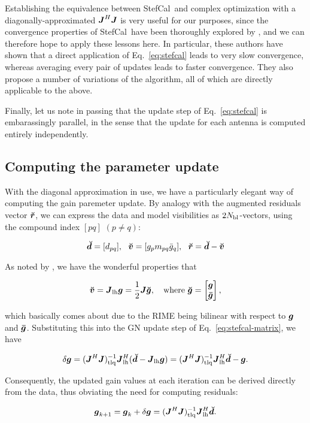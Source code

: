 \documentclass[useAMS,usenatbib]{mn2e}
\newcommand{\vecg}{\bmath{g}}
\newcommand{\mat}[1]{{\bmath{#1}}}
\newcommand{\JJ}{\mat{J}} %
\newcommand{\JHJ}{\JJ^H\JJ} %
\newcommand{\StefCal}{{\sc StefCal}}
\begin{document}
Establishing the equivalence between \StefCal\ and complex optimization with a diagonally-approximated $\JJ^H\JJ$ is 
very useful for our purposes, since the convergence properties of \StefCal\ have been thoroughly explored 
by \citet{Stefcal}, and we can therefore hope to apply these lessons here. In particular, these authors have shown 
that a direct application of Eq.~\ref{eq:stefcal} leads to very slow convergence, whereas averaging every pair of 
updates leads to faster convergence. They also propose a number of variations of the algorithm, all of which are 
directly applicable to the above.

Finally, let us note in passing that the update step of Eq.~\ref{eq:stefcal} is embarassingly parallel, in the sense 
that the update for each antenna is computed entirely independently.

\subsection{Computing the parameter update}

With the diagonal approximation in use, we have a particularly elegant way of computing the gain paremeter update.
By analogy with the augmented residuals vector $\Rr$, we can express the data and model visibilities as $2N_\mathrm{bl}$-vectors,
using the compound index $[pq]$ $(p\ne q)$:

\[
\Dd = [ d_{pq} ],~~\Vv = [ g_p m_{pq} \bar{g}_q ],~~\Rr =\Dd-\Vv
\]

As noted by \citet{tasse-cohjones}, we have the wonderful properties that

\begin{equation}
\label{eq:v_Jg}
\Vv = \JJ_\LEFT \bmath{g}  = \frac{1}{2}\JJ \Gg,~~~\mathrm{where}~\Gg = \Matrix{c}{\bmath{g} \\ \bmath{\bar g}},
\end{equation}

which basically comes about due to the RIME being bilinear with respect to $\bmath{g}$ and $\bmath{\bar g}$. 
Substituting this into the GN update step of Eq.~\ref{eq:stefcal-matrix}, we have 

\[
\delta\vecg = (\JHJ)_\UL^{-1} \JJ_\LEFT^H (\Dd - \JJ_\LEFT \vecg) = (\JHJ)^{-1}_\UL \JJ_\LEFT^H \Dd - \vecg.
\]

Consequently, the updated gain values at each iteration can be derived directly from the data, thus obviating the need
for computing residuals:

\begin{equation}
\label{eq:ghat}
\vecg_{k+1} = \vecg_k + \delta\vecg = (\JHJ)^{-1}_\UL \JJ_\LEFT^H \Dd.
\end{equation}
\end{document}
